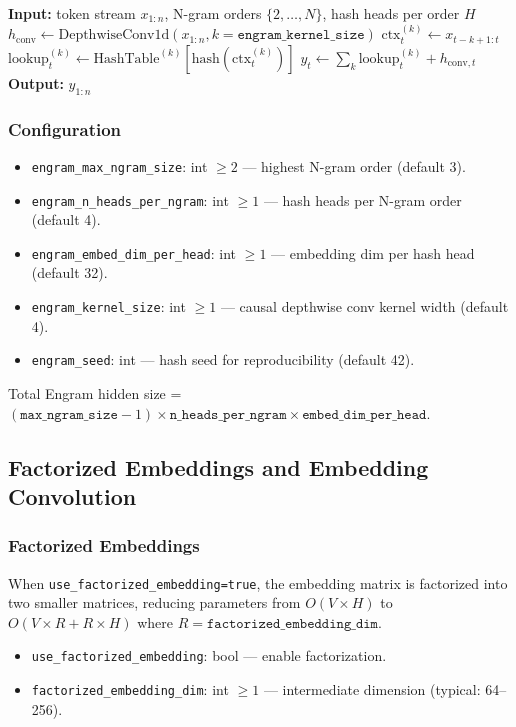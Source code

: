 \begin{algorithmic}[1]
\State \textbf{Input:} token stream $x_{1:n}$, N-gram orders $\{2, \ldots, N\}$, hash heads per order $H$
\State $h_{\text{conv}} \gets \text{DepthwiseConv1d}(x_{1:n}, k=\texttt{engram\_kernel\_size})$ 
    \State $\text{ctx}_t^{(k)} \gets x_{t-k+1:t}$ 
    \State $\text{lookup}^{(k)}_t \gets \text{HashTable}^{(k)}[\text{hash}(\text{ctx}_t^{(k)})]$ 
\EndFor
\State $y_t \gets \sum_{k} \text{lookup}^{(k)}_t + h_{\text{conv},t}$ 
\State \textbf{Output:} $y_{1:n}$
\end{algorithmic}

\subsubsection{Configuration}
\begin{itemize}[leftmargin=*]
    \item \texttt{engram\_max\_ngram\_size}: int $\ge 2$ --- highest N-gram order (default 3).
    \item \texttt{engram\_n\_heads\_per\_ngram}: int $\ge 1$ --- hash heads per N-gram order (default 4).
    \item \texttt{engram\_embed\_dim\_per\_head}: int $\ge 1$ --- embedding dim per hash head (default 32).
    \item \texttt{engram\_kernel\_size}: int $\ge 1$ --- causal depthwise conv kernel width (default 4).
    \item \texttt{engram\_seed}: int --- hash seed for reproducibility (default 42).
\end{itemize}
Total Engram hidden size = $(\texttt{max\_ngram\_size} - 1) \times \texttt{n\_heads\_per\_ngram} \times \texttt{embed\_dim\_per\_head}$.

\subsection{Factorized Embeddings and Embedding Convolution}

\subsubsection{Factorized Embeddings}
When \texttt{use\_factorized\_embedding=true}, the embedding matrix is factorized into two smaller matrices, reducing parameters from $O(V \times H)$ to $O(V \times R + R \times H)$ where $R = \texttt{factorized\_embedding\_dim}$.
\begin{itemize}[leftmargin=*]
    \item \texttt{use\_factorized\_embedding}: bool --- enable factorization.
    \item \texttt{factorized\_embedding\_dim}: int $\ge 1$ --- intermediate dimension (typical: 64--256).
\end{itemize}

